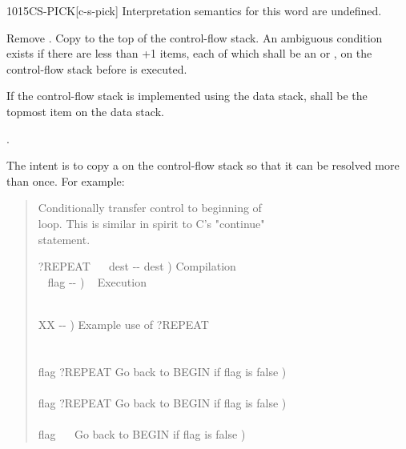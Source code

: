 \begin{worddef}{1015}{CS-PICK}[c-s-pick]
\interpret
	Interpretation semantics for this word are undefined.

\execute

	Remove . Copy  to the top of the
	control-flow stack. An ambiguous condition exists if there
	are less than +1 items, each of which shall be an
	 or , on the control-flow stack
	before  is executed.

	If the control-flow stack is implemented using the data stack,
	 shall be the topmost item on the data stack.

\see {}.

	\begin{rationale} %
		The intent is to copy a  on the control-flow
		stack so that it can be resolved more than once. For example:
		\begin{quote}\ttfamily
			 Conditionally transfer control to beginning of \\
			 loop.  This is similar in spirit to C's "continue" \\
			 statement.

			\word{:} ?REPEAT ~~ dest -{}- dest )  Compilation \\
			\tab\tab\tab~ flag -{}- ) \tab~ Execution \\
			  ~   \\
			\word{;} 

			\word{:} XX  -{}- )  Example use of ?REPEAT \\
			\tab {} \\
			\tab\tab {\ldots} \\
			\tab flag ?REPEAT  Go back to BEGIN if flag is false ) \\
			\tab\tab {\ldots} \\
			\tab flag ?REPEAT  Go back to BEGIN if flag is false ) \\
			\tab\tab {\ldots} \\
			\tab flag ~~  Go back to BEGIN if flag is false ) \\
			\word{;}
		\end{quote}
	\end{rationale}


\end{worddef}
